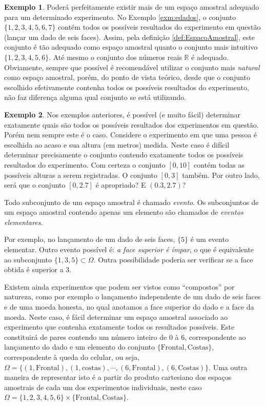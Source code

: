 \documentclass[
]{book}
\theoremstyle{definition}
\theoremstyle{definition}
\newtheorem{example}{Exemplo}[chapter]
\theoremstyle{definition}
\theoremstyle{remark}
\begin{document}
\begin{example}
\protect\hypertarget{exm:exampespamost}{}{\label{exm:exampespamost} }Poderá perfeitamente existir mais de um espaço amostral adequado para um determinado experimento. No Exemplo \ref{exm:edados}, o conjunto \(\{1,2,3,4,5,6,7\}\) contém todos os possíveis resultados do experimento em questão (lançar um dado de seis faces). Assim, pela definição \ref{def:EspacoAmostral}, este conjunto é tão adequado como espaço amostral quanto o conjunto mais intuitivo \(\{1,2,3,4,5,6\}\). Até mesmo o conjunto dos números reais \(\mathbb{R}\) é adequado. Obviamente, sempre que possível é recomendável utilizar o conjunto mais \emph{natural} como espaço amostral, porém, do ponto de vista teórico, desde que o conjunto escolhido efetivamente contenha todos os possíveis resultados do experimento, não faz diferença alguma qual conjunto se está utilizando.
\end{example}

\begin{example}
\protect\hypertarget{exm:examexp}{}{\label{exm:examexp} }Nos exemplos anteriores, é possível (e muito fácil) determinar exatamente quais são todos os possíveis resultados dos experimentos em questão. Porém nem sempre este é o caso. Considere o experimento em que uma pessoa é escolhida ao acaso e sua altura (em metros) medida. Neste caso é difícil determinar precisamente o conjunto contendo exatamente todos os possíveis resultados do experimento. Com certeza o conjunto \([0,10]\) contém todas as possíveis alturas a serem registradas. O conjunto \([0,3]\) também. Por outro lado, será que o conjunto \([0,2.7]\) é apropriado? E \((0.3,2.7)\)?
\end{example}

Todo subconjunto de um espaço amostral é chamado \emph{evento}. Os
subconjuntos de um espaço amostral contendo apenas um elemento são
chamados de \emph{eventos elementares}.

Por exemplo, no lançamento de um dado de seis faces, \(\{5\}\) é um evento elementar. Outro evento possível é: \emph{a face superior é ímpar}, o que é equivalente ao subconjunto \(\{1,3,5\}\subset\Omega\). Outra possibilidade poderia ser verificar se a face obtida é superior a 3.

Existem ainda experimentos que podem ser vistos como ``compostos'' por natureza, como por exemplo o lançamento independente de um dado de seis faces e de uma moeda honesta, no qual anotamos a face superior do dado e a face da moeda. Neste caso, é fácil determinar um espaço amostral associado ao experimento que contenha exatamente todos os resultados possíveis. Este constituirá de pares contendo um número inteiro de 0 à 6, correspondente ao lançamento do dado e um elemento do conjunto \(\{\mathrm{Frontal},\mathrm{Costas}\}\), correspondente à queda do celular, ou seja, \(\Omega=\{(1, \mathrm{Frontal}), (1,\mathrm{costas}), \cdots, (6, \mathrm{Frontal}), (6,\mathrm{Costas})\}\). Uma outra maneira de representar isto é a partir do produto cartesiano dos espaços amostrais de cada um dos experimentos individuais, neste caso \(\Omega=\{1,2,3,4,5,6\}\times\{\mathrm{Frontal},\mathrm{Costas}\}\).
\end{document}
